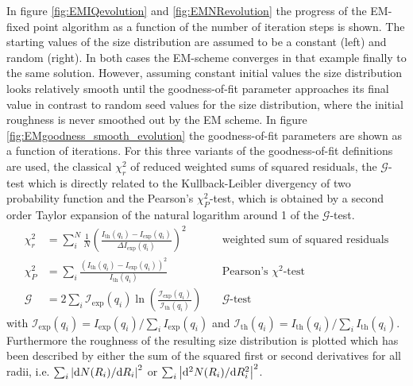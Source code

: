 In figure \ref{fig:EMIQevolution} and \ref{fig:EMNRevolution} the progress of the EM-fixed point algorithm as a function of the number of iteration steps is shown. The starting values of the size distribution are assumed to be a constant (left) and random (right). In both cases the EM-scheme converges in that example finally to the same solution. However, assuming constant initial values the size distribution looks relatively smooth until the goodness-of-fit parameter approaches its final value in contrast to random seed values for the size distribution, where the initial roughness is never smoothed out by the EM scheme. In figure \ref{fig:EMgoodness_smooth_evolution} the goodness-of-fit parameters are shown as a function of iterations. For this three variants of the goodness-of-fit definitions are used, the classical $\chi_r^2$ of reduced weighted sums of squared  residuals, the $\mathcal{G}$-test which is directly related to the Kullback-Leibler divergency of two probability function and the Pearson's $\chi_P^2$-test, which is obtained by a second order Taylor expansion of the natural logarithm around 1 of the  $\mathcal{G}$-test.
\begin{align}
  \chi_r^2 &= \sum_i^N \frac{1}{N}\left(\frac{I_\mathrm{th}(q_i)-I_\mathrm{exp}(q_i)}{\Delta I_\mathrm{exp}(q_i)}\right)^2 &~ &\mbox{weighted sum of squared residuals} \label{eq:goodnessoffit_chi2}\\
  \chi_P^2 &= \sum_i \frac{\left(I_\mathrm{th}(q_i)-I_\mathrm{exp}(q_i)\right)^2}{I_\mathrm{th}(q_i)} &~ &\mbox{Pearson's $\chi^2$-test} \label{eq:goodnessoffit_chi2test}\\
  \mathcal{G} &= 2\sum_i \mathcal{I}_\mathrm{exp}(q_i)\ln\left(\frac{\mathcal{I}_\mathrm{exp}(q_i)}{\mathcal{I}_\mathrm{th}(q_i)}\right) &~ & \mathcal{G}\mbox{-test} \label{eq:goodnessoffit_Gtest}
\end{align}
with $\mathcal{I}_\mathrm{exp}(q_i)=I_\mathrm{exp}(q_i)/\sum_i I_\mathrm{exp}(q_i)$ and $\mathcal{I}_\mathrm{th}(q_i)=I_\mathrm{th}(q_i)/\sum_i I_\mathrm{th}(q_i)$.
Furthermore the roughness of the resulting size distribution is plotted which has been described by either the sum of the squared first or second derivatives for all radii, i.e. $\sum_i \abs{\mathrm{d}N(R_i)/\mathrm{d}R_i}^2$ or $\sum_i \abs{\mathrm{d}^2N(R_i)/\mathrm{d}R_i^2}^2$.
